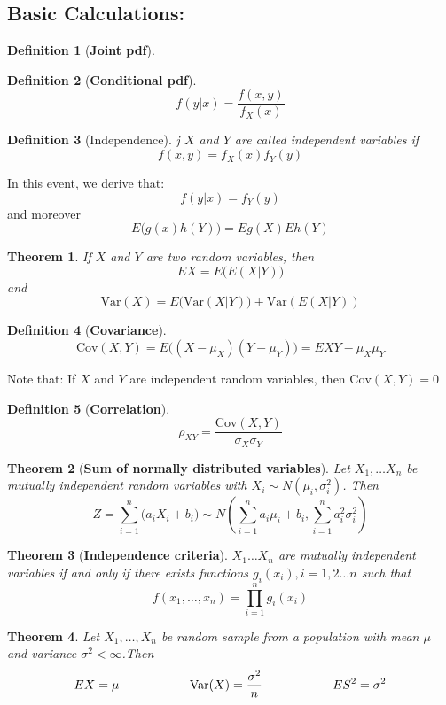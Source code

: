 \documentclass[11pt]{article}
\newtheorem{thm}{Theorem}[subsection]
\newtheorem{df}{Definition}[section]
\begin{document}
	\subsection{Basic Calculations: }
	\begin{df}[\textbf{Joint pdf}]
		
	\end{df}
	\begin{df}[\textbf{Conditional pdf}]
 		$$f(y|x) = \dfrac{f(x, y)}{f_X(x)} $$ 
	\end{df}
\begin{df}[Independence]j $X$ and $Y$ are called independent variables if 
	$$f(x, y) = f_X(x) f_Y(y) $$
\end{df}
In this event, we derive that: 
$$f(y |x) = f_Y(y)$$
and moreover
$$E\bigg(g(x) h(Y)\bigg) = Eg(X) Eh(Y) $$
	\begin{thm}
	If $X$ and $Y$ are two random variables, then
	$$EX = E \big(E(X|Y)\big) $$ and
	$$ \text{Var}(X) = E\big(\text{Var}(X|Y)\big) + \text{Var}(E(X|Y)) $$
	\end{thm}
	\begin{df}[\textbf{Covariance}]
		$$\text{Cov}(X, Y) = E \big((X - \mu_X) (Y - \mu_Y)\big) = EXY - \mu_X \mu_Y$$
	\end{df}
Note that: If $X$ and $Y$ are independent random variables, then $\text{Cov}(X, Y) = 0$
\begin{df}[\textbf{Correlation}]
	$$\rho_{XY} = \dfrac{\text{Cov}(X, Y)}{\sigma_X \sigma_Y}$$
\end{df}
\begin{thm} [\textbf{Sum of normally distributed variables}]
	Let $X_1, \dots X_n$ be mutually independent random variables with $X_i \sim N(\mu_i, \sigma_i^2)$. Then 
	$$Z = \sum_{ i = 1}^n \big(a_iX_i + b_i\big) \sim N\left(\sum_{ i = 1}^n a_i\mu_i + b_i, \sum_{i = 1}^n a_i^2 \sigma_i^2\right) $$
\end{thm}
\begin{thm}[\textbf{Independence criteria}] $X_1 \dots X_n$ are mutually independent variables if and only if there exists functions $g_i(x_i), i = 1, 2 \dots n $ such that
	$$f(x_1, \dots, x_n) = \prod_{i = 1}^{n} g_i(x_i) $$
\end{thm}
\begin{thm}
	Let $X_1, \dots, X_n$ be random sample from a population with mean $\mu$ and variance $\sigma^2 < \infty$.Then 
	$$E\bar{X} =\mu \hspace*{2.0cm } \text{Var}(\bar{X}) = \dfrac{\sigma^2}{n} \hspace*{2.0 cm} ES^2 = \sigma^2 $$
\end{thm}
\end{document}
